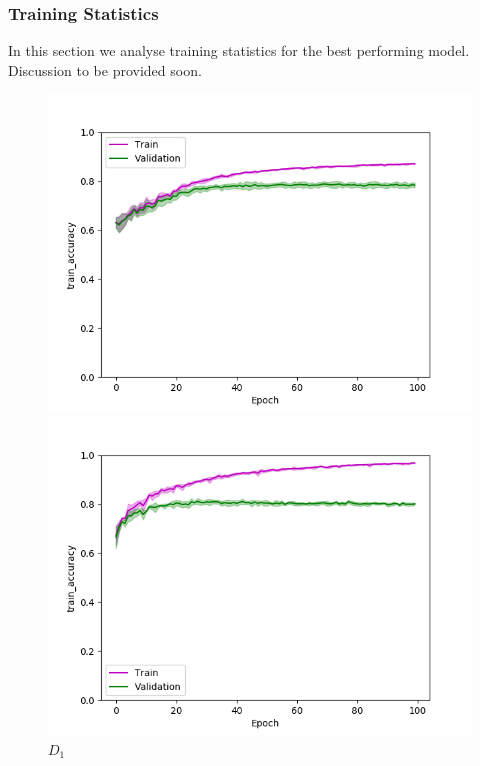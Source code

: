 \def\year{2017}\relax \documentclass[letterpaper]{article}
\begin{document}
\subsubsection{Training Statistics}
In this section we analyse training statistics for the best performing model. Discussion to be provided soon.
\begin{figure}
\centering
\begin{minipage}{.24\textwidth}
  \centering
\includegraphics[width=\textwidth]{pics/d1_train_accuracy_mean_train_test.png}
\caption{$D_1$}\label{fig:d1acctraintest}
\end{minipage}
\begin{minipage}{.01\textwidth}
\end{minipage}
\begin{minipage}{.24\textwidth}
  \centering
\includegraphics[width=\textwidth]{pics/d2_train_accuracy_mean_train_test.png}

\end{minipage}
\end{figure}
\end{document}

